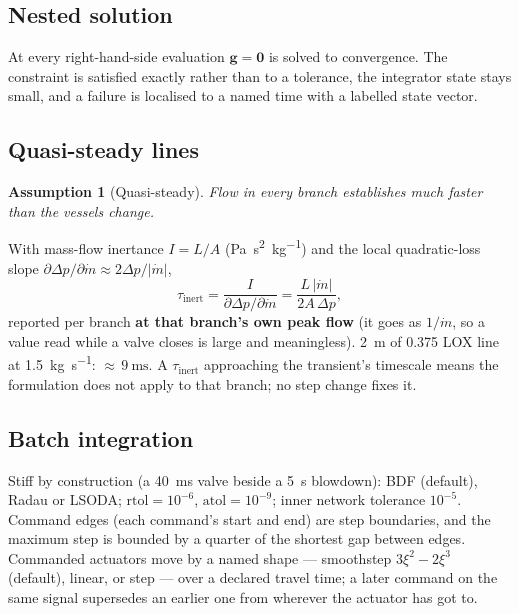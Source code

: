 \documentclass[11pt,a4paper]{article}
\newtheorem{assumption}{Assumption}
\newcommand{\mdot}{\dot{m}}
\begin{document}
\subsection{Nested solution}
At every right-hand-side evaluation $\mathbf{g}=\mathbf{0}$ is solved to
convergence. The constraint is satisfied exactly rather than to a tolerance,
the integrator state stays small, and a failure is localised to a named time
with a labelled state vector.

\subsection{Quasi-steady lines}\label{sec:qs}
\begin{assumption}[Quasi-steady]\label{as:qs}
Flow in every branch establishes much faster than the vessels change.
\end{assumption}
With mass-flow inertance $I=L/A$ (\si{\pascal\second\squared\per\kilogram}) and the local
quadratic-loss slope $\partial\Delta p/\partial\mdot\approx2\Delta p/|\mdot|$,
\begin{equation}
  \tau_{\mathrm{inert}} = \frac{I}{\partial\Delta p/\partial\mdot}
    = \frac{L\,|\mdot|}{2A\,\Delta p},
  \label{eq:inert}
\end{equation}
reported per branch \textbf{at that branch's own peak flow} (it goes as
$1/\mdot$, so a value read while a valve closes is large and meaningless).
\SI{2}{\metre} of \SI{0.375}{\inch} LOX line at \SI{1.5}{\kilogram\per\second}:
${\approx}\,\SI{9}{\milli\second}$. A $\tau_{\mathrm{inert}}$ approaching the
transient's timescale means the formulation does not apply to that branch; no
step change fixes it.

\subsection{Batch integration}
Stiff by construction (a \SI{40}{\milli\second} valve beside a \SI{5}{\second}
blowdown): BDF (default), Radau or LSODA; $\mathrm{rtol}=10^{-6}$,
$\mathrm{atol}=10^{-9}$; inner network tolerance $10^{-5}$. Command edges (each
command's start and end) are step boundaries, and the maximum step is bounded
by a quarter of the shortest gap between edges. Commanded actuators move by a
named shape --- smoothstep $3\xi^2-2\xi^3$ (default), linear, or step --- over
a declared travel time; a later command on the same signal supersedes an
earlier one from wherever the actuator has got to.
\end{document}
